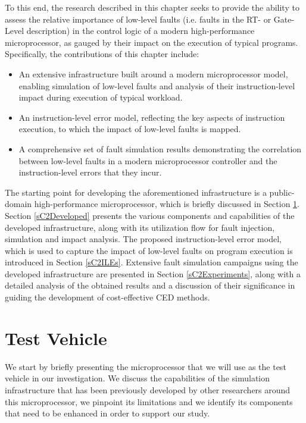 \documentclass[12pt]{yalephd}
\begin{document}
To this end, the research described in this chapter seeks to provide the ability to assess the relative importance of low-level faults (i.e. faults in the RT- or Gate-Level description) in the control logic of a modern high-performance microprocessor, as gauged by their impact on the execution of typical programs. Specifically, the contributions of this chapter include:
\begin{itemize}
\item An extensive infrastructure built around a modern microprocessor model, enabling simulation of low-level faults and analysis of their instruction-level impact during execution of typical workload.
\item An instruction-level error model, reflecting the key aspects of instruction execution, to which the impact of low-level faults is mapped.
\item A comprehensive set of fault simulation results demonstrating the correlation between low-level faults in a modern microprocessor controller and the instruction-level errors that they incur.
\end{itemize}

The starting point for developing the aforementioned infrastructure is a public-domain high-performance microprocessor, which is briefly discussed in Section \ref{sC2Existing}. Section \ref{sC2Developed} presents the various components and capabilities of the developed infrastructure, along with its utilization flow for fault injection, simulation and impact analysis. The proposed instruction-level error model, which is used to capture the impact of low-level faults on program execution is introduced in Section \ref{sC2ILEs}. Extensive fault simulation campaigns using the developed infrastructure are presented in Section \ref{sC2Experiments}, along with a detailed analysis of the obtained results and a discussion of their significance in guiding the development of cost-effective CED methods.

\section{Test Vehicle}\label{sC2Existing}

We start by briefly presenting the microprocessor that we will use as the test vehicle in our investigation. We discuss the capabilities of the simulation infrastructure that has been previously developed by other researchers around this microprocessor, we pinpoint its limitations and we identify its components that need to be enhanced in order to support our study.
\end{document}
